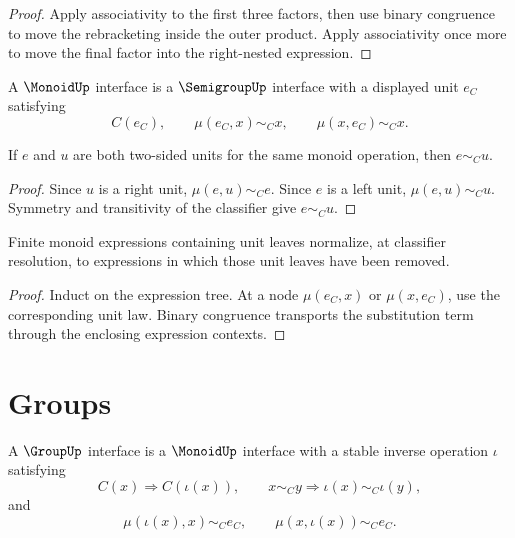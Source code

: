 \begin{proof}
Apply associativity to the first three factors, then use binary congruence to
move the rebracketing inside the outer product.  Apply associativity once more
to move the final factor into the right-nested expression.
\end{proof}

\begin{definition}
\label{def:algebra-spine-monoid}
A $\MonoidUp$ interface is a $\SemigroupUp$ interface with a displayed unit
$e_C$ satisfying
$$
C(e_C),
\qquad
\mu(e_C,x)\sim_C x,
\qquad
\mu(x,e_C)\sim_C x.
$$
\end{definition}

\begin{theorem}
\label{thm:algebra-spine-unit-uniqueness}
If $e$ and $u$ are both two-sided units for the same monoid operation, then
$e\sim_C u$.
\end{theorem}

\begin{proof}
Since $u$ is a right unit, $\mu(e,u)\sim_C e$.  Since $e$ is a left unit,
$\mu(e,u)\sim_C u$.  Symmetry and transitivity of the classifier give
$e\sim_C u$.
\end{proof}

\begin{corollary}
\label{cor:algebra-spine-unit-normalization}
Finite monoid expressions containing unit leaves normalize, at classifier
resolution, to expressions in which those unit leaves have been removed.
\end{corollary}

\begin{proof}
Induct on the expression tree.  At a node $\mu(e_C,x)$ or $\mu(x,e_C)$, use
the corresponding unit law.  Binary congruence transports the substitution
term through the enclosing expression contexts.
\end{proof}

\section{Groups}
\label{sec:algebra-spine-groups}

\begin{definition}
\label{def:algebra-spine-group}
A $\GroupUp$ interface is a $\MonoidUp$ interface with a stable inverse
operation $\iota$ satisfying
$$
C(x)\Longrightarrow C(\iota(x)),
\qquad
x\sim_C y\Longrightarrow \iota(x)\sim_C\iota(y),
$$
and
$$
\mu(\iota(x),x)\sim_C e_C,
\qquad
\mu(x,\iota(x))\sim_C e_C.
$$
\end{definition}

